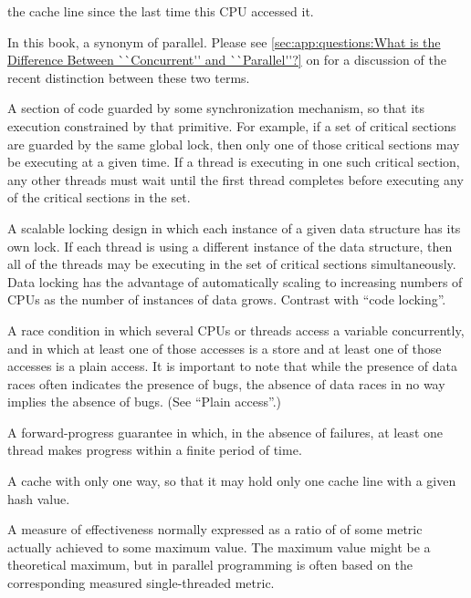 \begin{description}
	the cache line since the last time this CPU accessed it.
\item[\IX{Concurrent}:]
	In this book, a synonym of parallel.
	Please see \cref{sec:app:questions:What is the Difference Between ``Concurrent'' and ``Parallel''?}
	on 
	for a discussion of the recent distinction between these two
	terms.
\item[\IX{Critical Section}:]
	A section of code guarded by some synchronization mechanism,
	so that its execution constrained by that primitive.
	For example, if a set of critical sections are guarded by
	the same global lock, then only one of those critical sections
	may be executing at a given time.
	If a thread is executing in one such critical section,
	any other threads must wait until the first thread completes
	before executing any of the critical sections in the set.
\item[\IXh{Data}{Locking}:]
	A scalable locking design in which each instance of a given
	data structure has its own lock.
	If each thread is using a different instance of the
	data structure, then all of the threads may be executing in
	the set of critical sections simultaneously.
	Data locking has the advantage of automatically scaling to
	increasing numbers of CPUs as the number of instances of
	data grows.
	Contrast with ``code locking''.
\item[\IX{Data Race}:]
	A race condition in which several CPUs or threads access
	a variable concurrently, and in which at least one of those
	accesses is a store and at least one of those accesses
	is a plain access.
	It is important to note that while the presence of data races
	often indicates the presence of bugs, the absence of data races
	in no way implies the absence of bugs.
	(See ``Plain access''.)
\item[\IX{Deadlock Free}:]
	A forward-progress guarantee in which, in the absence of
	failures, at least one thread makes progress within a finite
	period of time.
\item[\IXh{Direct-Mapped}{Cache}:]
	A cache with only one way, so that it may hold only one cache
	line with a given hash value.
\item[\IX{Efficiency}:]
	A measure of effectiveness normally expressed as a ratio of
	of some metric actually achieved to some maximum value.
	The maximum value might be a theoretical maximum, but in
	parallel programming is often based on the corresponding
	measured single-threaded metric.
\item[\IX{Embarrassingly Parallel}:]

\end{description}
